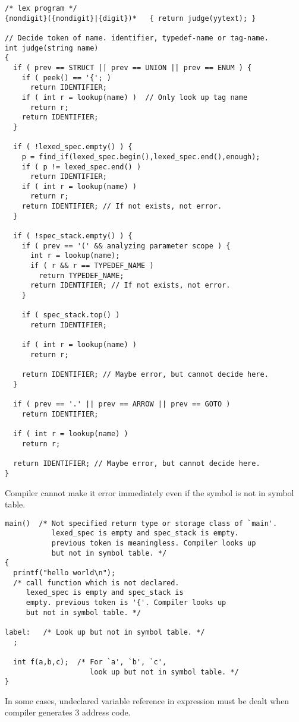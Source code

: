 \begin{verbatim}
/* lex program */
{nondigit}({nondigit}|{digit})*   { return judge(yytext); }

// Decide token of name. identifier, typedef-name or tag-name.
int judge(string name)
{
  if ( prev == STRUCT || prev == UNION || prev == ENUM ) {
    if ( peek() == '{'; )
      return IDENTIFIER;
    if ( int r = lookup(name) )  // Only look up tag name
      return r;
    return IDENTIFIER;
  }

  if ( !lexed_spec.empty() ) {
    p = find_if(lexed_spec.begin(),lexed_spec.end(),enough);
    if ( p != lexed_spec.end() )
      return IDENTIFIER;
    if ( int r = lookup(name) )
      return r;
    return IDENTIFIER; // If not exists, not error.
  }

  if ( !spec_stack.empty() ) {
    if ( prev == '(' && analyzing parameter scope ) {
      int r = lookup(name);
      if ( r && r == TYPEDEF_NAME )
        return TYPEDEF_NAME;
      return IDENTIFIER; // If not exists, not error.
    }

    if ( spec_stack.top() )
      return IDENTIFIER;

    if ( int r = lookup(name) )
      return r;   

    return IDENTIFIER; // Maybe error, but cannot decide here.
  }

  if ( prev == '.' || prev == ARROW || prev == GOTO )
    return IDENTIFIER;

  if ( int r = lookup(name) )
    return r;

  return IDENTIFIER; // Maybe error, but cannot decide here.
}
\end{verbatim}

Compiler cannot make it error immediately even if the symbol is not in
symbol table.
\begin{verbatim}
main()  /* Not specified return type or storage class of `main'.
           lexed_spec is empty and spec_stack is empty.
           previous token is meaningless. Compiler looks up
           but not in symbol table. */
{
  printf("hello world\n");
  /* call function which is not declared.
     lexed_spec is empty and spec_stack is
     empty. previous token is '{'. Compiler looks up
     but not in symbol table. */

label:   /* Look up but not in symbol table. */
  ;

  int f(a,b,c);  /* For `a', `b', `c',
                    look up but not in symbol table. */
}
\end{verbatim}
In some cases, undeclared variable reference in expression 
must be dealt when compiler generates 3 address code.

